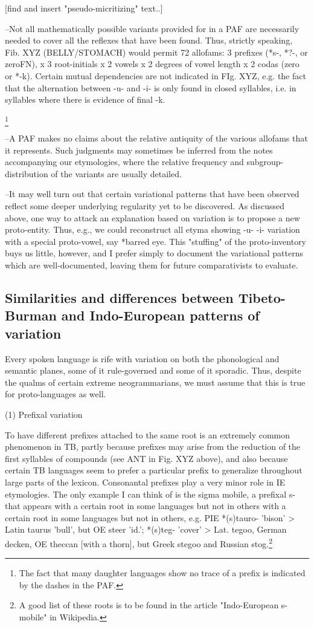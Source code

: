 [find and insert "pseudo-micritizing" text..]

--Not all mathematically possible variants provided for in a PAF are necessarily needed to cover all the reflexes that have been found. Thus, strictly speaking, Fib. XYZ (BELLY/STOMACH) would permit 72 allofams: 3 prefixes (*s-, *?-, or zeroFN), x 3 root-initials x 2 vowels x 2 degrees of vowel length x 2 codas (zero or *-k). Certain mutual dependencies are not indicated in FIg. XYZ, e.g. the fact that the alternation between -u- and -i- is only found in closed syllables, i.e. in syllables where there is evidence of final -k.

\footnote{The fact that many daughter languages show no trace of a prefix is indicated by the dashes in the PAF.}

--A PAF makes no claims about the relative antiquity of the various allofams that it represents. Such judgments may sometimes be inferred from the notes accompanying our etymologies, where the relative frequency and subgroup-distribution of the variants are usually detailed.

--It may well turn out that certain variational patterns that have been observed reflect some deeper underlying regularity yet to be discovered. As discussed above, one way to attack an explanation based on variation is to propose a new proto-entity. Thus, e.g., we could reconstruct all etyma showing -u-   -i- variation with a special proto-vowel, say *barred eye. This "stuffing" of the proto-inventory buys us little, however, and I prefer simply to document the variational patterns which are well-documented, leaving them for future comparativists to evaluate.


\subsection{Similarities and differences between Tibeto-Burman and Indo-European patterns of variation}

Every spoken language is rife with variation on both the phonological and semantic planes, some of it rule-governed and some of it sporadic. Thus, despite the qualms of certain extreme neogrammarians, we must assume that this is true for proto-languages as well. 

(1) Prefixal variation

To have different prefixes attached to the same root is an extremely common phenomenon in TB, 
partly because prefixes may arise from the reduction of the first syllables of compounds (see ANT in Fig. XYZ above), and also because certain TB languages seem to prefer a particular prefix to generalize throughout large parts of the lexicon.  Consonantal prefixes play a very minor role in IE etymologies. The only example I can think of is the sigma mobile, a prefixal s- that appears with a certain root in some languages but not in others 
 with a certain root in some languages but not in others, e.g. PIE *(s)tauro- 'bison' > Latin taurus 'bull', but OE steer 'id.'; *(s)teg- 'cover' > Lat. tegoo, German decken, OE theccan [with a thorn], but Greek stegoo and Russian stog.\footnote{A good list of these roots is to be found in the article "Indo-European s-mobile" in Wikipedia.}

